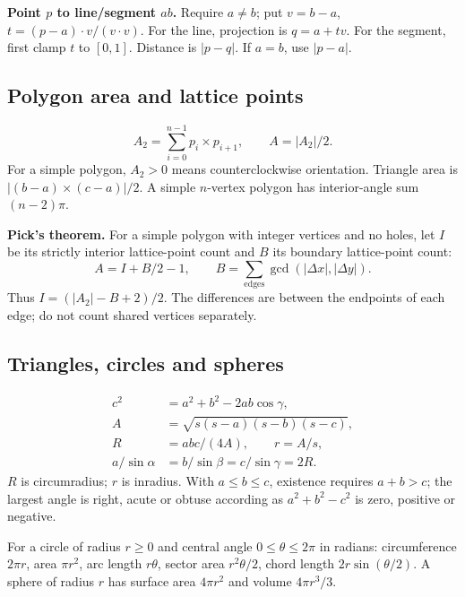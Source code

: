 \textbf{Point $p$ to line/segment $ab$.} Require $a\ne b$;
put $v=b-a$, $t=(p-a)\cdot v/(v\cdot v)$.
For the line, projection is $q=a+tv$.
For the segment, first clamp $t$ to $[0,1]$.
Distance is $|p-q|$. If $a=b$, use $|p-a|$.

\subsection{Polygon area and lattice points}
\[
 A_2=\sum_{i=0}^{n-1}p_i\times p_{i+1},\qquad A=|A_2|/2.
\]
For a simple polygon, $A_2>0$ means counterclockwise orientation.
Triangle area is $|(b-a)\times(c-a)|/2$.
A simple $n$-vertex polygon has interior-angle sum $(n-2)\pi$.

\textbf{Pick's theorem.} For a simple polygon with integer vertices
and no holes, let $I$ be its strictly interior lattice-point count and
$B$ its boundary lattice-point count:
\[
 A=I+B/2-1,\qquad
 B=\sum_{\text{edges}}\gcd(|\Delta x|,|\Delta y|).
\]
Thus $I=(|A_2|-B+2)/2$. The differences are between the endpoints
of each edge; do not count shared vertices separately.

\subsection{Triangles, circles and spheres}
\[
\begin{aligned}
 c^2&=a^2+b^2-2ab\cos\gamma,\\
 A&=\sqrt{s(s-a)(s-b)(s-c)},\\
 R&=abc/(4A),\qquad r=A/s,\\
 a/\sin\alpha&=b/\sin\beta=c/\sin\gamma=2R.
\end{aligned}
\]
$R$ is circumradius; $r$ is inradius. With $a\le b\le c$,
existence requires $a+b>c$; the largest angle is right, acute or
obtuse according as $a^2+b^2-c^2$ is zero, positive or negative.

For a circle of radius $r\ge0$ and central angle $0\le\theta\le2\pi$
in radians: circumference $2\pi r$, area $\pi r^2$, arc length $r\theta$,
sector area $r^2\theta/2$, chord length $2r\sin(\theta/2)$.
A sphere of radius $r$ has surface area $4\pi r^2$ and volume
$4\pi r^3/3$.

